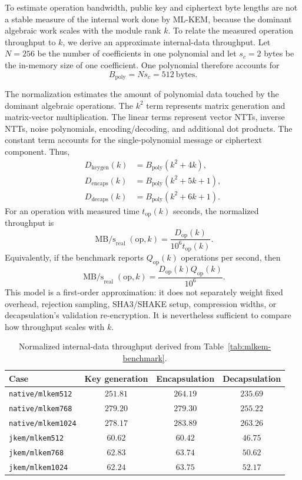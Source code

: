 To estimate operation bandwidth, public key and ciphertext byte lengths are not a stable measure of the internal work done by ML-KEM, because the dominant algebraic work scales with the module rank $k$. To relate the measured operation throughput to $k$, we derive an approximate internal-data throughput. Let $N=256$ be the number of coefficients in one polynomial and let $s_c=2$ bytes be the in-memory size of one coefficient. One polynomial therefore accounts for
$$
B_{\mathrm{poly}} = N s_c = 512 \ \mathrm{bytes}.
$$

The normalization estimates the amount of polynomial data touched by the dominant algebraic operations. The $k^2$ term represents matrix generation and matrix-vector multiplication. The linear terms represent vector NTTs, inverse NTTs, noise polynomials, encoding/decoding, and additional dot products. The constant term accounts for the single-polynomial message or ciphertext component. Thus,
$$
\begin{aligned}
D_{\mathrm{keygen}}(k) &= B_{\mathrm{poly}}(k^2 + 4k),\\
D_{\mathrm{encaps}}(k) &= B_{\mathrm{poly}}(k^2 + 5k + 1),\\
D_{\mathrm{decaps}}(k) &= B_{\mathrm{poly}}(k^2 + 6k + 1).
\end{aligned}
$$
For an operation with measured time $t_{\mathrm{op}}(k)$ seconds, the normalized throughput is
$$
\operatorname{MB/s}_{\mathrm{real}}(\mathrm{op}, k) = \frac{D_{\mathrm{op}}(k)}{10^6 t_{\mathrm{op}}(k)} .
$$
Equivalently, if the benchmark reports $Q_{\mathrm{op}}(k)$ operations per second, then
$$
\operatorname{MB/s}_{\mathrm{real}}(\mathrm{op}, k) = \frac{D_{\mathrm{op}}(k) Q_{\mathrm{op}}(k)}{10^6}.
$$
This model is a first-order approximation: it does not separately weight fixed overhead, rejection sampling, SHA3/SHAKE setup, compression widths, or decapsulation's validation re-encryption. It is nevertheless sufficient to compare how throughput scales with $k$.

\begin{table}[htbp]
    \centering
    \caption{Normalized internal-data throughput derived from Table~\ref{tab:mlkem-benchmark}.}
    \label{tab:normalized-throughput}
    \begin{tabular}{l c c c}
        \toprule
        \textbf{Case} &
        \textbf{Key generation} &
        \textbf{Encapsulation} &
        \textbf{Decapsulation} \\
        \midrule
        \texttt{native/mlkem512}  & $251.81$ & $264.19$ & $235.69$ \\
        \texttt{native/mlkem768}  & $279.20$ & $279.30$ & $255.22$ \\
        \texttt{native/mlkem1024} & $278.17$ & $283.89$ & $263.26$ \\
        \texttt{jkem/mlkem512}    & $60.62$  & $60.42$  & $46.75$ \\
        \texttt{jkem/mlkem768}    & $62.83$  & $63.74$  & $50.62$ \\
        \texttt{jkem/mlkem1024}   & $62.24$  & $63.75$  & $52.17$ \\
        \bottomrule
    \end{tabular}
\end{table}

